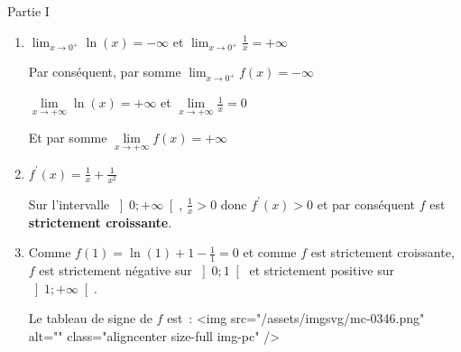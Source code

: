 \begin{corrige}
     \begin{h3} Partie I \end{h3}
     \begin{enumerate}
          \item
          $\lim_{x\rightarrow 0^+} \ln\left(x\right)=-\infty   $  et  $ \lim_{x\rightarrow 0^+} \frac{1}{x}=+\infty $
          \par
          Par conséquent, par somme $\lim_{x\rightarrow 0^+} f\left(x\right)=-\infty $
          \par
          $\lim\limits_{x\rightarrow +\infty } \ln\left(x\right)=+\infty   $ et $ \lim\limits_{x\rightarrow +\infty } \frac{1}{x}=0$
          \par
          Et par somme $\lim\limits_{x\rightarrow +\infty }f\left(x\right)=+\infty $
          \item
          $f^{\prime}\left(x\right)= \frac{1}{x}+\frac{1}{x^{2}}$
          \par
          Sur l'intervalle $\left]0;+\infty \right[$, $\frac{1}{x} > 0$ donc $f^{\prime}\left(x\right) > 0$ et par conséquent $f$ est \textbf{strictement croissante}.
          \item
          Comme $f\left(1\right)=\ln\left(1\right)+1-\frac{1}{1}=0$ et comme $f$ est strictement croissante, $f$ est strictement négative sur $\left]0;1\right[$ et strictement positive sur $\left]1 ;+\infty \right[$.
          \par
          Le tableau de signe de $f$ est :
          <img src="/assets/imgsvg/mc-0346.png" alt="" class="aligncenter size-full  img-pc" />
\begin{center}
 \begin{extern}%
\end{extern}
\end{center}
\end{enumerate}
\end{corrige}

